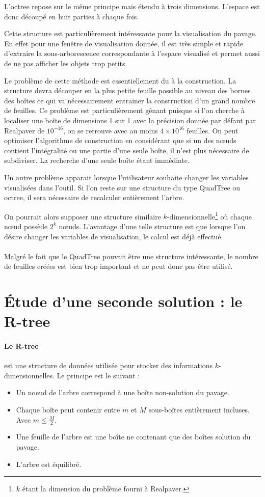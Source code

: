 L'octree repose sur le même principe mais étendu à trois dimensions. L'espace est donc découpé en huit parties à chaque fois.

Cette structure est particulièrement intéressante pour la visualisation du pavage. En effet pour une fenêtre de visualisation donnée, il est très simple et rapide d'extraire la sous-arborescence correspondante à l'espace visualisé et permet aussi de ne pas afficher les objets trop petits.

Le problème de cette méthode est essentiellement du à la construction. La structure devra découper en la plus petite feuille possible au niveau des bornes des boîtes ce qui va nécessairement entrainer la construction d'un grand nombre de feuilles. Ce problème est particulièrement gênant puisque si l'on cherche à localiser une boîte de dimensions 1 sur 1 avec la précision donnée par défaut par Realpaver de $10^{-16}$, on se retrouve avec au moins $4 \times 10^{16}$ feuilles. On peut optimiser l'algorithme de construction en considérant que si un des nœuds contient l'intégralité ou une partie d'une seule boîte, il n'est plus nécessaire de subdiviser. La recherche d'une seule boîte étant immédiate.

Un autre problème apparait lorsque l'utilisateur souhaite changer les variables visualisées dans l'outil. Si l'on reste sur une structure du type QuadTree ou octree, il sera nécessaire de recalculer entièrement l'arbre.

On pourrait alors supposer une structure similaire $k$-dimensionnelle\footnote{$k$ étant la dimension du problème fourni à Realpaver.} où chaque nœud possède $2^k$ nœuds. L'avantage d'une telle structure est que lorsque l'on désire changer les variables de visualisation, le calcul est déjà effectué.

\paragraph{} Malgré le fait que le QuadTree pouvait être une structure intéressante, le nombre de feuilles créées est bien trop important et ne peut donc pas être utilisé.

\section{\'Etude d'une seconde solution : le R-tree}
\paragraph{Le R-tree} est une structure de données utilisée pour stocker des informations $k$-dimensionnelles. Le principe est le suivant :
\begin{itemize}
 \item Un noeud de l'arbre correspond à une boîte non-solution du pavage.
 \item Chaque boîte peut contenir entre $m$ et $M$ sous-boîtes entièrement incluses. Avec $m\leq \frac{M}{2}$.
 \item Une feuille de l'arbre est une boîte ne contenant que des boîtes solution du pavage.
 \item L'arbre est équilibré.
\end{itemize}


